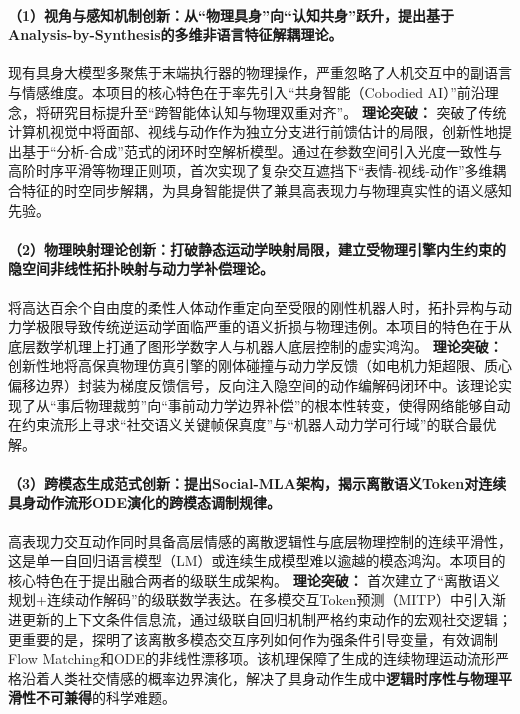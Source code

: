 \paragraph{\textbf{（1）视角与感知机制创新：从“物理具身”向“认知共身”跃升，提出基于Analysis-by-Synthesis的多维非语言特征解耦理论。}}
现有具身大模型多聚焦于末端执行器的物理操作，严重忽略了人机交互中的副语言与情感维度。本项目的核心特色在于率先引入“共身智能（Cobodied AI）”前沿理念，将研究目标提升至“跨智能体认知与物理双重对齐”。
\textbf{理论突破：} 突破了传统计算机视觉中将面部、视线与动作作为独立分支进行前馈估计的局限，创新性地提出基于“分析-合成”范式的闭环时空解析模型。通过在参数空间引入光度一致性与高阶时序平滑等物理正则项，首次实现了复杂交互遮挡下“表情-视线-动作”多维耦合特征的时空同步解耦，为具身智能提供了兼具高表现力与物理真实性的语义感知先验。

\paragraph{\textbf{（2）物理映射理论创新：打破静态运动学映射局限，建立受物理引擎内生约束的隐空间非线性拓扑映射与动力学补偿理论。}}
将高达百余个自由度的柔性人体动作重定向至受限的刚性机器人时，拓扑异构与动力学极限导致传统逆运动学面临严重的语义折损与物理违例。本项目的特色在于从底层数学机理上打通了图形学数字人与机器人底层控制的虚实鸿沟。
\textbf{理论突破：} 创新性地将高保真物理仿真引擎的刚体碰撞与动力学反馈（如电机力矩超限、质心偏移边界）封装为梯度反馈信号，反向注入隐空间的动作编解码闭环中。该理论实现了从“事后物理裁剪”向“事前动力学边界补偿”的根本性转变，使得网络能够自动在约束流形上寻求“社交语义关键帧保真度”与“机器人动力学可行域”的联合最优解。

\paragraph{\textbf{（3）跨模态生成范式创新：提出Social-MLA架构，揭示离散语义Token对连续具身动作流形ODE演化的跨模态调制规律。}}
高表现力交互动作同时具备高层情感的离散逻辑性与底层物理控制的连续平滑性，这是单一自回归语言模型（LM）或连续生成模型难以逾越的模态鸿沟。本项目的核心特色在于提出融合两者的级联生成架构。
\textbf{理论突破：} 首次建立了“离散语义规划+连续动作解码”的级联数学表达。在多模交互Token预测（MITP）中引入渐进更新的上下文条件信息流，通过级联自回归机制严格约束动作的宏观社交逻辑；更重要的是，探明了该离散多模态交互序列如何作为强条件引导变量，有效调制Flow Matching和ODE的非线性漂移项。该机理保障了生成的连续物理运动流形严格沿着人类社交情感的概率边界演化，解决了具身动作生成中\textbf{逻辑时序性与物理平滑性不可兼得}的科学难题。
